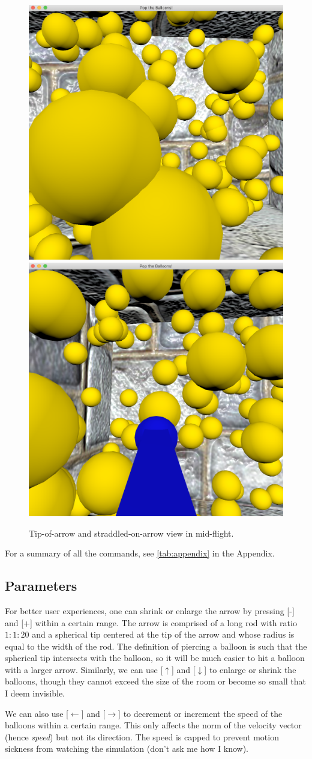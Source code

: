 \documentclass{article}[12pt]
\begin{document}
\begin{figure}[b]
    \centering
    \includegraphics[width=.47\textwidth]{flight-a.png}
    \includegraphics[width=.47\textwidth]{flight-b.png}
    \caption{Tip-of-arrow and straddled-on-arrow view in mid-flight. 
    \label{fig:view}}
\end{figure}

For a summary of all the commands, see \cref{tab:appendix} in the Appendix. 

\subsection{Parameters}

For better user experiences, one can shrink or enlarge the arrow by pressing [-] and [+] within a certain range. The arrow is comprised of a long rod with ratio $1:1:20$ and a spherical tip centered at the tip of the arrow and whose radius is equal to the width of the rod. The definition of piercing a balloon is such that the spherical tip intersects with the balloon, so it will be much easier to hit a balloon with a larger arrow. Similarly, we can use [$\uparrow$] and [$\downarrow$] to enlarge or shrink the balloons, though they cannot exceed the size of the room or become so small that I deem invisible. 

We can also use [$\leftarrow$] and [$\rightarrow$] to decrement or increment the speed of the balloons within a certain range. This only affects the norm of the velocity vector (hence \emph{speed}) but not its direction. The speed is capped to prevent motion sickness from watching the simulation (don't ask me how I know). 
\end{document}
